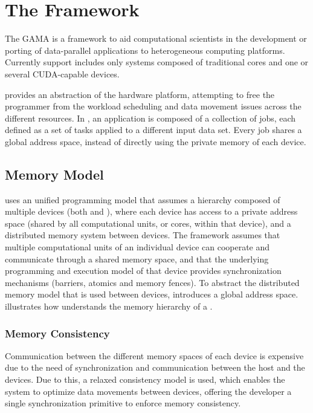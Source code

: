 \documentclass[main.tex]{subfiles}
\begin{document}
\chapter{The \gama Framework} \label{section:gama}




The \acf{GAMA} is a framework to aid computational scientists in the development or porting of data-parallel applications to heterogeneous computing platforms. Currently \hetplat support includes only systems composed of traditional \cpus cores and one or several CUDA-capable \gpu devices.

\gama provides an abstraction of the hardware platform, attempting to free the programmer from the workload scheduling and data movement issues across the different resources. In \gama, an application is composed of a collection of jobs, each defined as a set of tasks applied to a different input data set. Every job shares a global address space, instead of directly using the private memory of each device.


\section{Memory Model}

\gama uses an unified programming model that assumes a hierarchy composed of multiple devices (both \cpus and \gpus), where each device has access to a private address space (shared by all computational units, or cores, within that device), and a distributed memory system between devices. The framework assumes that multiple computational units of an individual device can cooperate and communicate through a shared memory space, and that the underlying programming and execution model of that device provides synchronization mechanisms (barriers, atomics and memory fences).
To abstract the distributed memory model that is used between devices, \gama introduces a global address space.  illustrates how \gama understands the memory hierarchy of a \hetplat.


\subsection{Memory Consistency}

Communication between the different memory spaces of each device is expensive due to the need of synchronization and communication between the host \cpu and the devices. Due to this, a relaxed consistency model is used, which enables the system to optimize data movements between devices, offering the developer a single synchronization primitive to enforce memory consistency.
\end{document}
